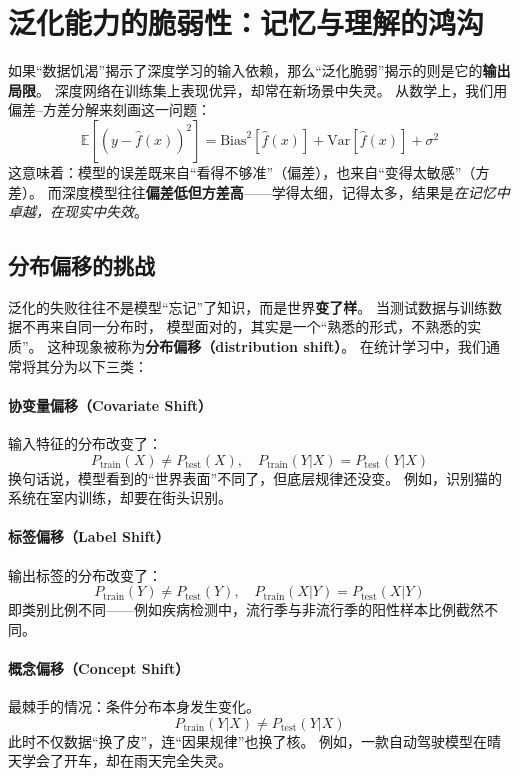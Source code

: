 \section{泛化能力的脆弱性：记忆与理解的鸿沟}

如果“数据饥渴”揭示了深度学习的输入依赖，那么“泛化脆弱”揭示的则是它的\textbf{输出局限}。  
深度网络在训练集上表现优异，却常在新场景中失灵。  
从数学上，我们用偏差–方差分解来刻画这一问题：  
$$\mathbb{E}[(y - \hat{f}(x))^2] = \text{Bias}^2[\hat{f}(x)] + \text{Var}[\hat{f}(x)] + \sigma^2$$  
这意味着：模型的误差既来自“看得不够准”（偏差），也来自“变得太敏感”（方差）。  
而深度模型往往\textbf{偏差低但方差高}——学得太细，记得太多，结果是\textit{在记忆中卓越，在现实中失效}。

\subsection{分布偏移的挑战}

泛化的失败往往不是模型“忘记”了知识，而是世界\textbf{变了样}。  
当测试数据与训练数据不再来自同一分布时，  
模型面对的，其实是一个“熟悉的形式，不熟悉的实质”。  
这种现象被称为\textbf{分布偏移（distribution shift）}。  
在统计学习中，我们通常将其分为以下三类：

\paragraph{协变量偏移（Covariate Shift）}  
输入特征的分布改变了：  
$$P_{\text{train}}(X) \neq P_{\text{test}}(X), \quad P_{\text{train}}(Y|X) = P_{\text{test}}(Y|X)$$  
换句话说，模型看到的“世界表面”不同了，但底层规律还没变。  
例如，识别猫的系统在室内训练，却要在街头识别。

\paragraph{标签偏移（Label Shift）}  
输出标签的分布改变了：  
$$P_{\text{train}}(Y) \neq P_{\text{test}}(Y), \quad P_{\text{train}}(X|Y) = P_{\text{test}}(X|Y)$$  
即类别比例不同——例如疾病检测中，流行季与非流行季的阳性样本比例截然不同。

\paragraph{概念偏移（Concept Shift）}  
最棘手的情况：条件分布本身发生变化。  
$$P_{\text{train}}(Y|X) \neq P_{\text{test}}(Y|X)$$  
此时不仅数据“换了皮”，连“因果规律”也换了核。  
例如，一款自动驾驶模型在晴天学会了开车，却在雨天完全失灵。

